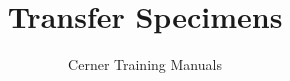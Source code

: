 

\title{Transfer Specimens} %
\author{Cerner Training Manuals}


\frontmatter
\maketitle %
\tableofcontents

\mainmatter


\backmatter
{}


